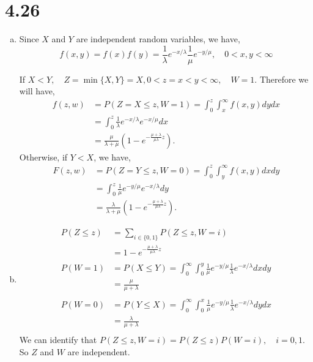 \documentclass[letterpaper]{article}
\newcommand{\intzi}{\int_0^\infty}
\begin{document}
    \section*{4.26}
    \begin{enumerate}[(a)]
    \item
    Since $X$ and $Y$ are independent random variables, we have,
    \[
    f(x,y) = f(x) f(y) = \frac{1}{\lambda} e^{-x/\lambda} \frac{1}{\mu} e^{-y/\mu}, \quad 0 < x, y < \infty
    \]
    
    If $X<Y, \quad Z=\min\{X,Y\} = X, 0 < z=x < y < \infty, \quad W = 1$. Therefore we will have,
    \begin{align*}
    f(z, w) &= P(Z=X \le z, W=1) = \int_0^z \int_x^\infty f(x,y)dydx \\
    & = \int_0^z \frac{1}{\lambda} e^{-x/\lambda} e^{-x/\mu} dx \\
    & = \frac{\mu}{\lambda + \mu} (1- e^{-\frac{\mu+\lambda}{\mu\lambda}z}). 
    \end{align*}
    Otherwise, if $Y<X$, we have,
    \begin{align*}
    F(z, w) &= P(Z=Y \le z, W=0) = \int_0^z \int_y^\infty f(x,y)dxdy \\
    & = \int_0^z \frac{1}{\mu} e^{-y/\mu} e^{-x/\lambda} dy \\
    & = \frac{\lambda}{\lambda + \mu} (1- e^{-\frac{\mu+\lambda}{\mu\lambda}z}). 
    \end{align*}
    \item
    \begin{align*}
    P(Z \le z) & = \sum_{i\in\{0, 1\}} P(Z \le z, W=i) \\
    & = 1- e^{-\frac{\mu+\lambda}{\mu\lambda}z}\\
    \\
    P(W = 1) & = P(X \le Y) = \intzi \int_0^y \frac{1}{\mu} e^{-y/\mu} \frac{1}{\lambda} e^{-x/\lambda} dx dy \\
    & = \frac{\mu}{\mu+\lambda}\\
    \\
    P(W = 0) & = P(Y \le X) = \intzi \int_0^x \frac{1}{\mu} e^{-y/\mu} \frac{1}{\lambda} e^{-x/\lambda} dy dx \\
    & = \frac{\lambda}{\mu+\lambda}\\
    \end{align*}
    We can identify that $P(Z\le z, W=i) = P(Z \le z)P(W = i), \quad i = 0, 1$. So $Z$ and $W$ are independent.
    \end{enumerate}
\end{document}

